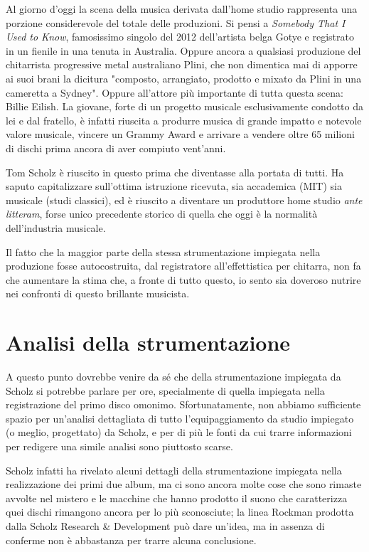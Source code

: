 \documentclass[class=book, crop=false, oneside, 12pt]{standalone}
\begin{document}
Al giorno d'oggi la scena della musica derivata dall'home studio rappresenta una porzione considerevole del totale delle produzioni. %
Si pensi a \emph{Somebody That I Used to Know}, famosissimo singolo del 2012 dell'artista belga Gotye e registrato in un fienile in una tenuta in Australia. Oppure ancora a qualsiasi produzione del chitarrista progressive metal australiano Plini, che non dimentica mai di apporre ai suoi brani la dicitura "composto, arrangiato, prodotto e mixato da Plini in una cameretta a Sydney"\cite{yt:plini}. Oppure all'attore più importante di tutta questa scena: Billie Eilish. La giovane, forte di un progetto musicale esclusivamente condotto da lei e dal fratello, è infatti riuscita a produrre musica di grande impatto e notevole valore musicale, vincere un Grammy Award e arrivare a vendere oltre 65 milioni di dischi prima ancora di aver compiuto vent'anni.

Tom Scholz è riuscito in questo prima che diventasse alla portata di tutti. Ha saputo capitalizzare sull'ottima istruzione ricevuta, sia accademica (MIT) sia musicale (studi classici), ed è riuscito a diventare un produttore home studio \emph{ante litteram}, forse unico precedente storico di quella che oggi è la normalità dell'industria musicale. 

Il fatto che la maggior parte della stessa strumentazione impiegata nella produzione fosse autocostruita, dal registratore all'effettistica per chitarra, non fa che aumentare la stima che, a fronte di tutto questo, io sento sia doveroso nutrire nei confronti di questo brillante musicista. 

\section{Analisi della strumentazione}
A questo punto dovrebbe venire da sé che della strumentazione impiegata da Scholz si potrebbe parlare per ore, specialmente di quella impiegata nella registrazione del primo disco omonimo. Sfortunatamente, non abbiamo sufficiente spazio per un'analisi dettagliata di tutto l'equipaggiamento da studio impiegato (o meglio, progettato) da Scholz, e per di più le fonti da cui trarre informazioni per redigere una simile analisi sono piuttosto scarse. 

Scholz infatti ha rivelato alcuni dettagli della strumentazione impiegata nella realizzazione dei primi due album, ma ci sono ancora molte cose che sono rimaste avvolte nel mistero e le macchine che hanno prodotto il suono che caratterizza quei dischi rimangono ancora per lo più sconosciute\cite{site:rockmanfr_story}; la linea Rockman prodotta dalla Scholz Research \& Development può dare un'idea, ma in assenza di conferme non è abbastanza per trarre alcuna conclusione.
\end{document}
